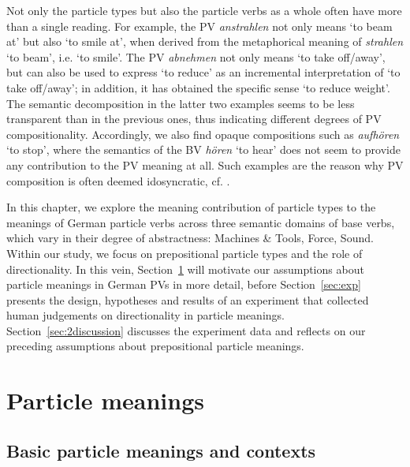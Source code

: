 \documentclass[output=paper]{langsci/langscibook}
\begin{document}
Not only the particle types but also the particle verbs as a whole
often have more than a single reading. For example, the PV
\textit{anstrahlen} not only means `to beam at' but also `to smile
at', when derived from the metaphorical meaning of \textit{strahlen}
`to beam', i.e. `to smile'. The PV \textit{abnehmen} not only means
`to take off/away', but can also be used to express `to reduce' as an
incremental interpretation of `to take off/away'; in addition, it has
obtained the specific sense `to reduce weight'. The semantic
decomposition in the latter two examples seems to be less transparent
than in the previous ones, thus indicating different degrees of PV
compositionality. Accordingly, we also find opaque compositions such
as \textit{aufhören} `to stop', where the semantics of the BV
\textit{hören} `to hear' does not seem to provide any contribution
to the PV meaning at all. Such examples are the reason why PV
composition is often deemed idosyncratic, cf. \cite{Kratzer:03}.

In this chapter, we explore the meaning contribution of particle types
to the meanings of German particle verbs across three semantic domains
of base verbs, which vary in their degree of abstractness:
Machines \& Tools, Force, Sound. With\-in our study, we focus
on prepositional particle types and the role of directionality. In
this vein, Section~\ref{sec:p-meaning} will motivate our assumptions
about particle meanings in German PVs in more detail, before
Section~\ref{sec:exp} presents the design, hypotheses and results of
an experiment that collected human judgements on directionality in
particle meanings. Section~\ref{sec:2discussion} discusses the
experiment data and reflects on our preceding assumptions about
prepositional particle meanings.


\section{Particle meanings}
\label{sec:p-meaning}

\subsection{Basic particle meanings and contexts}
\end{document}
